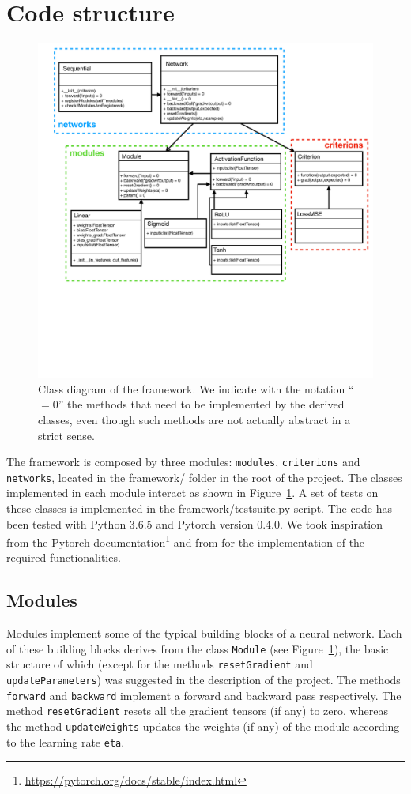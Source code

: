 \documentclass[10pt,final,a4paper]{article}
\begin{document}
\section{Code structure}
\begin{figure}
\centering
\includegraphics[scale=0.42, clip=true, trim=45 270 0 10]{diagram.pdf}
\caption{Class diagram of the framework. We indicate with the notation ``$=0$'' the methods that need to be implemented by the derived classes, even though such methods are not actually abstract in a strict sense.}
\label{fig:diagram}
\end{figure}
The framework is composed by three modules: \verb|modules|, \verb|criterions| and \verb|networks|, located in the framework/ folder in the root of the project. The classes implemented in each module interact as shown in Figure~\ref{fig:diagram}. A set of tests on these classes is implemented in the framework/testsuite.py script. The code has been tested with Python 3.6.5 and Pytorch version 0.4.0. We took inspiration from the Pytorch documentation\footnote{\url{https://pytorch.org/docs/stable/index.html}} and from \cite{goodfellow2016deep} for the implementation of the required functionalities.
\subsection{Modules}
Modules implement some of the typical building blocks of a neural network. Each of these building blocks derives from the class \verb|Module| (see Figure~\ref{fig:diagram}), the basic structure of which (except for the methods \verb|resetGradient| and \verb|updateParameters|) was suggested in the description of the project. The methods \verb|forward| and \verb|backward| implement a forward and backward pass respectively. The method \verb|resetGradient| resets all the gradient tensors (if any) to zero, whereas the method \verb|updateWeights| updates the weights (if any) of the module according to the learning rate \verb|eta|.
\end{document}

